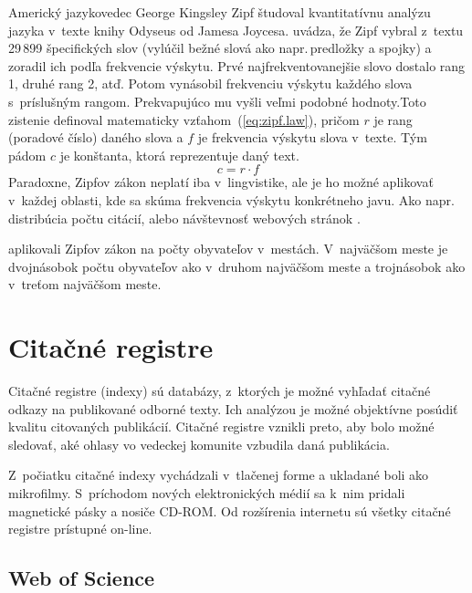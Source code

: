 Americký jazykovedec George Kingsley Zipf študoval kvantitatívnu analýzu jazyka
v~texte knihy Odyseus od Jamesa Joycesa.  \citet{Powers1998} uvádza, že Zipf
vybral z~textu 29\,899 špecifických slov (vylúčil bežné slová ako
napr.\,predložky a spojky) a zoradil ich podľa frekvencie výskytu.  Prvé
najfrekventovanejšie slovo dostalo rang 1, druhé rang 2, atď.  Potom vynásobil
frekvenciu výskytu každého slova s~príslušným rangom.  Prekvapujúco mu vyšli
veľmi podobné hodnoty.Toto zistenie definoval matematicky
vzťahom~(\ref{eq:zipf.law}), pričom $r$ je rang (poradové číslo) daného slova a
$f$ je frekvencia výskytu slova v~texte.  Tým pádom $c$ je konštanta, ktorá
reprezentuje daný text.
\begin{equation}
\label{eq:zipf.law}
c = r \cdot f
\end{equation}
Paradoxne, Zipfov zákon neplatí iba v~lingvistike, ale je ho možné aplikovať
v~každej oblasti, kde sa skúma frekvencia výskytu konkrétneho javu.  Ako
napr.\,distribúcia počtu citácií, alebo návštevnosť webových stránok
\citep{Li2002}.

\citet{Jiang2014} aplikovali Zipfov zákon na počty obyvateľov v~mestách.
V~najväčšom meste je dvojnásobok počtu obyvateľov ako v~druhom najväčšom meste a
trojnásobok ako v~treťom najväčšom meste.



\section{Citačné registre}

Citačné registre (indexy) sú databázy, z~ktorých je možné vyhľadať citačné
odkazy na publikované odborné texty.  Ich analýzou je možné objektívne posúdiť
kvalitu citovaných publikácií.  Citačné registre vznikli preto, aby bolo možné
sledovať, aké ohlasy vo vedeckej komunite vzbudila daná publikácia.

Z~počiatku citačné indexy vychádzali v~tlačenej forme a ukladané boli ako
mikrofilmy.  S~príchodom nových elektronických médií sa k~nim pridali magnetické
pásky a nosiče CD-ROM.  Od rozšírenia internetu sú všetky citačné registre
prístupné on-line.


\subsection{Web of Science}
\label{sec:wos}

